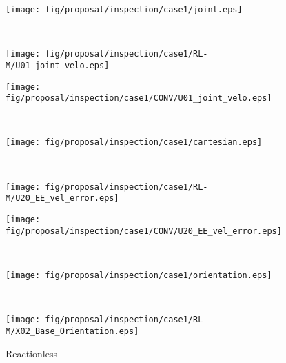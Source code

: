 \documentclass[preprint,12pt]{elsarticle}
\begin{document}
%
\begin{figure}[t]
  \centering
  \begin{minipage}[h]{0.60\linewidth}
    \centering
    \texttt{[image: fig/proposal/inspection/case1/joint.eps]}
  \end{minipage}\\
  \begin{minipage}[h]{0.40\linewidth}
    \texttt{[image: fig/proposal/inspection/case1/RL-M/U01\_joint\_velo.eps]}
  \end{minipage}
  \hspace{-7mm}
  \begin{minipage}[h]{0.40\linewidth}
    \texttt{[image: fig/proposal/inspection/case1/CONV/U01\_joint\_velo.eps]}
  \end{minipage}\\
  \vspace{-5mm}
  \begin{minipage}[h]{0.27\linewidth}
    \centering
    \texttt{[image: fig/proposal/inspection/case1/cartesian.eps]}
  \end{minipage}\\
  \vspace{-2mm}
  \begin{minipage}[h]{0.40\linewidth}
    \texttt{[image: fig/proposal/inspection/case1/RL-M/U20\_EE\_vel\_error.eps]}
  \end{minipage}
  \hspace{-7mm}
  \begin{minipage}[h]{0.40\linewidth}
    \texttt{[image: fig/proposal/inspection/case1/CONV/U20\_EE\_vel\_error.eps]}
  \end{minipage}\\
  \vspace{-5mm}
  \begin{minipage}[h]{0.35\linewidth}
    \centering
    \texttt{[image: fig/proposal/inspection/case1/orientation.eps]}
  \end{minipage}\\
  \vspace{-2mm}
  \begin{minipage}[h]{0.40\linewidth}
    \centering
    \texttt{[image: fig/proposal/inspection/case1/RL-M/X02\_Base\_Orientation.eps]}
    \footnotesize\par{\hspace{8mm}\vspace{-2mm}Reactionless}

\end{minipage}
\end{figure}
\end{document}
